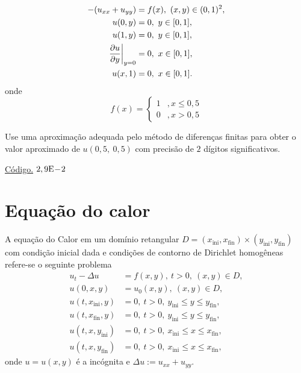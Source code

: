 \begin{exer}
  \begin{align}
    -(u_{xx} + u_{yy}) &= f(x),~(x, y)\in (0, 1)^2,\\
    u(0, y) &= 0,~y\in [0, 1],\\
    u(1, y) &= 0,~y\in [0, 1],\\
    \left.\frac{\partial u}{\partial y}\right|_{y=0} &= 0,~x\in [0, 1],\\
    u(x, 1) &= 0,~x\in [0, 1].
\end{align}
onde
\begin{equation}
  f(x) = \left\{
    \begin{array}{ll}
      1 &, x\leq 0,5\\
      0 &, x>0,5
    \end{array}
  \right.
\end{equation}
\end{exer}
Use uma aproximação adequada pelo método de diferenças finitas para obter o valor aproximado de $u(0,5,~0,5)$ com precisão de $2$ dígitos significativos.
\begin{resp}
  \ifisoctave 
  \href{https://github.com/phkonzen/notas/blob/master/src/MatematicaNumerica/cap_pvc/dados/exer_edp_Poisson_1/exeredp_Possoin_1.m}{Código.} 
  \fi
  $2,9\mathrm{E}\!-\!2$
\end{resp}

\section{Equação do calor}\label{cap_edp_sec_calor}

A equação do Calor em um domínio retangular $D = (x_{\text{ini}}, x_{\text{fin}})\times (y_{\text{ini}}, y_{\text{fin}})$ com condição inicial dada e condições de contorno de Dirichlet homogêneas refere-se o seguinte problema
\begin{align}
  u_t - \Delta u &= f(x, y),~t>0,~(x, y)\in D, \label{eq:edp_calor_eq}\\
  u(0,x,y) &= u_0(x,y),~(x,y)\in D,\\
  u(t, x_{\text{ini}}, y) &= 0,~t>0,~y_{\text{ini}}\leq y \leq y_{\text{fin}},\label{eq:edp_calor_bcxini}\\
  u(t, x_{\text{fin}}, y) &= 0,~t>0,~y_{\text{ini}}\leq y \leq y_{\text{fin}},\label{eq:edp_calor_bcxfin}\\
  u(t, x, y_{\text{ini}}) &= 0,~t>0,~x_{\text{ini}}\leq x \leq x_{\text{fin}},\label{eq:edp_calor_bcyini}\\
  u(t, x, y_{\text{fin}}) &= 0,~t>0,~x_{\text{ini}}\leq x \leq x_{\text{fin}},\label{eq:edp_calor_bcyfin}
\end{align}
onde $u = u(x,y)$ é a incógnita e $\Delta u := u_{xx} + u_{yy}$.

